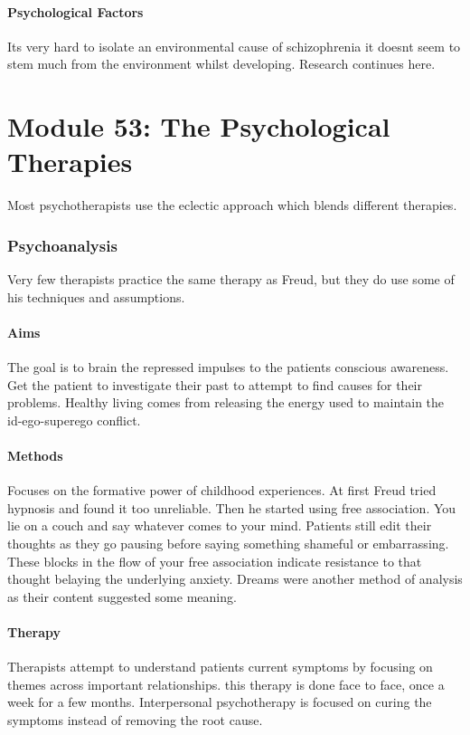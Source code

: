 \documentclass[12pt]{article}
\begin{document}
\subsection*{Psychological Factors}
Its very hard to isolate an environmental cause of schizophrenia it doesnt seem to stem much from the environment whilst developing. Research continues here.

\part*{Module 53: The Psychological Therapies}
Most psychotherapists use the eclectic approach which blends different therapies.
\section*{Psychoanalysis}
Very few therapists practice the same therapy as Freud, but they do use some of his techniques and assumptions.
\subsection*{Aims}
The goal is to brain the repressed impulses to the patients conscious awareness. Get the patient to investigate their past to attempt to find causes for their problems. Healthy living comes from releasing the energy used to maintain the id-ego-superego conflict.
\subsection*{Methods}
Focuses on the formative power of childhood experiences. At first Freud tried hypnosis and found it too unreliable. Then he started using free association. You lie on a couch and say whatever comes to your mind. Patients still edit their thoughts as they go pausing before saying something shameful or embarrassing. These blocks in the flow of your free association indicate resistance to that thought belaying the underlying anxiety. Dreams were another method of analysis as their content suggested some meaning. 
\subsection*{Therapy}
Therapists attempt to understand patients current symptoms by focusing on themes across important relationships. this therapy is done face to face, once a week for a few months. Interpersonal psychotherapy is focused on curing the symptoms instead of removing the root cause.
\end{document}
